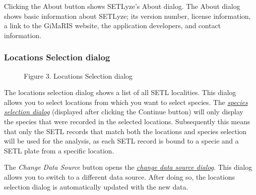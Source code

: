 \documentclass[letterpaper,10pt,english]{sphinxmanual}
\begin{document}
Clicking the About button shows SETLyze's About dialog. The About dialog
shows basic information about SETLyze; its version number, license
information, a link to the GiMaRIS website, the application developers,
and contact information.


\subsubsection{Locations Selection dialog}
\label{user_manual:dialog-loc-selection}\label{user_manual:locations-selection-dialog}\begin{figure}[htbp]
\centering
\capstart

\caption{Figure 3. Locations Selection dialog}\end{figure}

The locations selection dialog shows a list of all SETL localities. This
dialog allows you to select locations from which you want to select
species. The {\hyperref[user_manual:dialog-spe-selection]{\emph{species selection dialog}}}
(displayed after clicking the Continue button) will only display the
species that were recorded in the selected locations. Subsequently this
means that only the SETL records that match both the locations and
species selection will be used for the analysis, as each SETL record
is bound to a specie and a SETL plate from a specific location.

The \emph{Change Data Source} button opens the
{\hyperref[user_manual:dialog-change-data-source]{\emph{change data source dialog}}}. This
dialog allows you to switch to a different data source. After doing so,
the locations selection dialog is automatically updated with the new
data.
\end{document}
